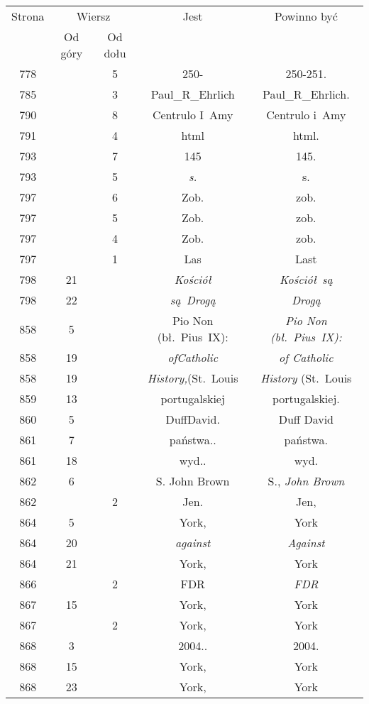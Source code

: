 \documentclass[a4paper,11pt]{article}
\begin{document}
\begin{center}
  \newpage

  \begin{tabular}{|c|c|c|c|c|}
    \hline
    Strona & \multicolumn{2}{c|}{Wiersz} & Jest
                              & Powinno być \\ \cline{2-3}
    & Od góry & Od dołu & & \\
    \hline
    778 & &  5 & 250- & 250-251. \\
    785 & &  3 & Paul\_R\_Ehrlich & Paul\_R\_Ehrlich. \\
    790 & &  8 & Centrulo I~Amy & Centrulo i~Amy \\
    791 & &  4 & html & html. \\
    793 & &  7 & 145 & 145. \\
    793 & &  5 & \textit{s.} & s. \\
    797 & &  6 & Zob. & zob. \\
    797 & &  5 & Zob. & zob. \\
    797 & &  4 & Zob. & zob. \\
    797 & &  1 & Las & Last \\
    798 & 21 & & \textit{Kościół} & \textit{Kościół~są} \\
    798 & 22 & & \textit{są~Drogą} & \textit{Drogą} \\
    858 &  5 & & Pio Non (bł.~Pius~IX):
           & \textit{Pio Non (bł.~Pius~IX):} \\
    858 & 19 & & \textit{ofCatholic} & \textit{of Catholic} \\
    858 & 19 & & \textit{History,}(St.~Louis
           & \textit{History} (St.~Louis \\
    859 & 13 & & portugalskiej & portugalskiej. \\
    860 &  5 & & DuffDavid. & Duff David \\
    861 &  7 & & państwa.. & państwa. \\
    861 & 18 & & wyd.. & wyd. \\
    862 &  6 & & S. John Brown & S., \textit{John Brown} \\
    862 & &  2 & Jen. & Jen, \\
    864 &  5 & & York, & York \\
    864 & 20 & & \textit{against} & \textit{Against} \\
    864 & 21 & & York, & York \\
    866 & &  2 & FDR & \textit{FDR} \\
    867 & 15 & & York, & York \\
    867 & &  2 & York, & York \\
    868 &  3 & & 2004.. & 2004. \\
    868 & 15 & & York, & York \\
    868 & 23 & & York, & York \\
    \hline
  \end{tabular}






\end{center}
\end{document}
